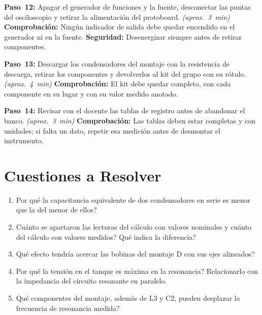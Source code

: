 \documentclass[12pt]{article}
\begin{document}
\begin{pasos}
  \item \textbf{Paso~12:} Apagar el generador de funciones y la fuente, desconectar las puntas del osciloscopio y retirar la alimentación del protoboard. \emph{(aprox.~\SI{3}{\minute})} \textbf{Comprobación:} Ningún indicador de salida debe quedar encendido en el generador ni en la fuente. \textbf{Seguridad:} Desenergizar siempre antes de retirar componentes.
  \item \textbf{Paso~13:} Descargar los condensadores del montaje con la resistencia de descarga, retirar los componentes y devolverlos al kit del grupo con su rótulo. \emph{(aprox.~\SI{4}{\minute})} \textbf{Comprobación:} El kit debe quedar completo, con cada componente en su lugar y con su valor medido anotado.
  \item \textbf{Paso~14:} Revisar con el docente las tablas de registro antes de abandonar el banco. \emph{(aprox.~\SI{3}{\minute})} \textbf{Comprobación:} Las tablas deben estar completas y con unidades; si falta un dato, repetir esa medición antes de desmontar el instrumento.
\end{pasos}

\section{Cuestiones a Resolver}\label{sec:cuestiones}
\begin{enumerate}
  \item \textquestiondown{}Por qué la capacitancia equivalente de dos condensadores en serie es menor que la del menor de ellos?
  \item \textquestiondown{}Cuánto se apartaron las lecturas del cálculo con valores nominales y cuánto del cálculo con valores medidos? \textquestiondown{}Qué indica la diferencia?
  \item \textquestiondown{}Qué efecto tendría acercar las bobinas del montaje D con sus ejes alineados?
  \item \textquestiondown{}Por qué la tensión en el tanque es máxima en la resonancia? Relacionarlo con la impedancia del circuito resonante en paralelo.
  \item \textquestiondown{}Qué componentes del montaje, además de L3 y C2, pueden desplazar la frecuencia de resonancia medida?
\end{enumerate}

\end{document}
